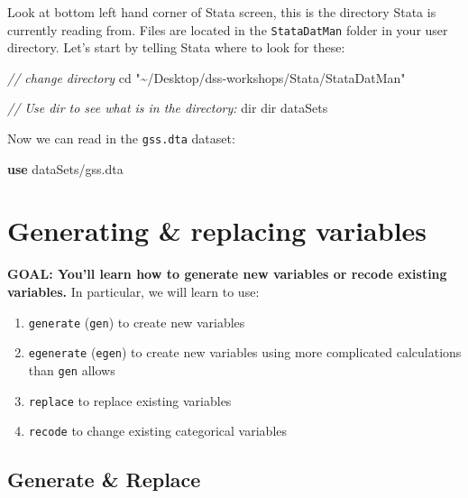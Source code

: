 \documentclass[
]{book}
\newenvironment{Shaded}{\begin{snugshade}}{\end{snugshade}}
\newcommand{\CommentTok}[1]{\textcolor[rgb]{0.56,0.35,0.01}{\textit{#1}}}
\newcommand{\KeywordTok}[1]{\textcolor[rgb]{0.13,0.29,0.53}{\textbf{#1}}}
\newcommand{\NormalTok}[1]{#1}
\newcommand{\OtherTok}[1]{\textcolor[rgb]{0.56,0.35,0.01}{#1}}
\newcommand{\StringTok}[1]{\textcolor[rgb]{0.31,0.60,0.02}{#1}}
\providecommand{\tightlist}{%
  \setlength{\itemsep}{0pt}\setlength{\parskip}{0pt}}
\begin{document}
Look at bottom left hand corner of Stata screen, this is the directory Stata is currently reading from. Files are located in the \texttt{StataDatMan} folder in your user directory. Let's start by telling Stata where to look for these:

\begin{Shaded}
\begin{Highlighting}[]
\CommentTok{// change directory}
\NormalTok{cd }\StringTok{"\textasciitilde{}/Desktop/dss{-}workshops/Stata/StataDatMan"}

\CommentTok{// Use dir to see what is in the directory:}
\OtherTok{dir}
\OtherTok{dir}\NormalTok{ dataSets}
\end{Highlighting}
\end{Shaded}

Now we can read in the \texttt{gss.dta} dataset:

\begin{Shaded}
\begin{Highlighting}[]
\KeywordTok{use}\NormalTok{ dataSets/gss.dta}
\end{Highlighting}
\end{Shaded}

\hypertarget{generating-replacing-variables-1}{%
\section{Generating \& replacing variables}\label{generating-replacing-variables-1}}

\begin{alert}

\textbf{GOAL: You'll learn how to generate new variables or recode existing variables.} In particular, we will learn to use:

\begin{enumerate}
\def\labelenumi{\arabic{enumi}.}
\tightlist
\item
  \texttt{generate} (\texttt{gen}) to create new variables
\item
  \texttt{egenerate} (\texttt{egen}) to create new variables using more complicated calculations than \texttt{gen} allows
\item
  \texttt{replace} to replace existing variables
\item
  \texttt{recode} to change existing categorical variables
\end{enumerate}

\end{alert}

\hypertarget{generate-replace}{%
\subsection{Generate \& Replace}\label{generate-replace}}
\end{document}
